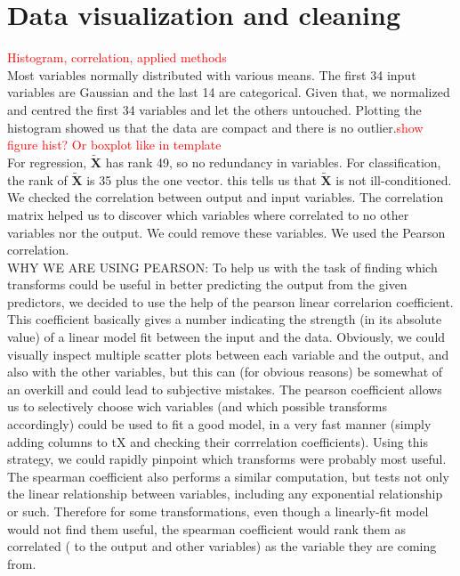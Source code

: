 \documentclass{article} %
\begin{document}
\section{Data visualization and cleaning}
\textcolor{red}{Histogram, correlation, applied methods}\\
Most variables normally distributed with various means. The first 34 input variables are Gaussian and the last 14 are categorical. Given that, we normalized and centred the first 34 variables and let the others untouched. Plotting the histogram showed us that the data are compact and there is no outlier.\textcolor{red}{show figure hist? Or boxplot like in template}\\
For regression, $\mathbf{\tilde{X}}$ has rank 49, so no redundancy in variables. For classification, the rank of $\mathbf{\tilde{X}}$ is 35 plus the one vector. this tells us that $\mathbf{\tilde{X}}$ is not ill-conditioned.\\
We checked the correlation between output and input variables. The correlation matrix helped us to discover which variables where correlated to no other variables nor the output. We could remove these variables. We used the Pearson correlation.\\

WHY WE ARE USING PEARSON:
To help us with the task of finding which transforms could be useful in better predicting the output from the given predictors, we decided to use the help of the pearson linear correlarion coefficient. This coefficient basically gives a number indicating the strength (in its absolute value) of a linear model fit between the input and the data. Obviously, we could visually inspect multiple scatter plots between each variable and the output, and also with the other variables, but this can (for obvious reasons) be somewhat of an overkill and could lead to subjective mistakes. The pearson coefficient allows us to selectively choose wich variables (and which possible transforms accordingly) could be used to fit a good model, in a very fast manner (simply adding columns to tX and checking their corrrelation coefficients). Using this strategy, we could rapidly pinpoint which transforms were probably most useful. The spearman coefficient also performs a similar computation, but tests not only the linear relationship between variables, including any exponential relationship or such. Therefore for some transformations, even though a linearly-fit model would not find them useful, the spearman coefficient would rank them as correlated ( to the output and other variables) as the variable they are coming from.\\
\end{document}
